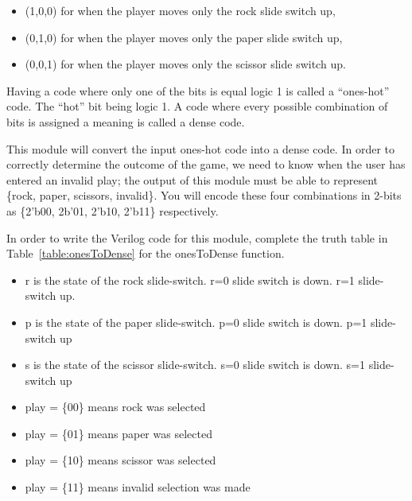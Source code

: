 \begin{itemize}
\item
  (1,0,0) for when the player moves only the rock slide switch up,
\item
  (0,1,0) for when the player moves only the paper slide switch up,
\item
  (0,0,1) for when the player moves only the scissor slide switch up.
\end{itemize}

Having a code where only one of the bits is equal logic 1 is called a
``ones-hot'' code. The ``hot'' bit being logic 1. A code where every
possible combination of bits is assigned a meaning is called a dense
code.

This module will convert the input ones-hot code into a dense code. In
order to correctly determine the outcome of the game, we need to know
when the user has entered an invalid play; the output of this module
must be able to represent \{rock, paper, scissors, invalid\}. You will
encode these four combinations in 2-bits as \{2'b00, 2b'01, 2'b10,
2'b11\} respectively.

In order to write the Verilog code for this module, complete the truth
table in Table~\ref{table:onesToDense} for the onesToDense function.

\begin{itemize}
\item
  r is the state of the rock slide-switch. r=0 slide switch is down. r=1
  slide-switch up.
\item
  p is the state of the paper slide-switch. p=0 slide switch is down.
  p=1 slide-switch up
\item
  s is the state of the scissor slide-switch. s=0 slide switch is down.
  s=1 slide-switch up
\item
  play = \{00\} means rock was selected
\item
  play = \{01\} means paper was selected
\item
  play = \{10\} means scissor was selected
\item
  play = \{11\} means invalid selection was made
\end{itemize}

